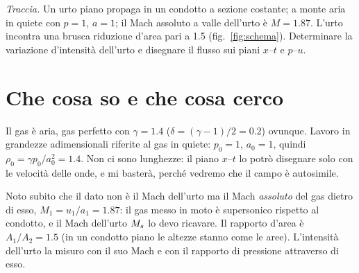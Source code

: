 

\graphicspath{{../../svolgimenti/2023-07-17_B72-E02_urto_contrazione/figure/}}

\newcommand{\uma}{u-a}
\newcommand{\upa}{u+a}
\newcommand{\Ar}{\mathcal{A}}



\maketitle

\emph{Traccia.} Un urto piano propaga in un condotto a sezione costante; a monte aria in quiete con $p=1$, $a=1$; il
Mach assoluto a valle dell'urto è $M=\num{1.87}$. L'urto incontra una brusca riduzione d'area pari a \num{1.5}
(fig.~\ref{fig:schema}). Determinare la variazione d'intensità dell'urto e disegnare il flusso sui piani $x$--$t$ e
$p$--$u$.


\section*{Che cosa so e che cosa cerco}
Il gas è aria, gas perfetto con $\gamma=\num{1.4}$ ($\delta=(\gamma-1)/2=\num{0.2}$) ovunque. Lavoro in grandezze
adimensionali riferite al gas in quiete: $p_0=1$, $a_0=1$, quindi $\rho_0=\gamma p_0/a_0^2=\num{1.4}$. Non ci sono
lunghezze: il piano $x$--$t$ lo potrò disegnare solo con le velocità delle onde, e mi basterà, perché vedremo che il
campo è autosimile.

Noto subito che il dato non è il Mach dell'urto ma il Mach \emph{assoluto} del gas dietro di esso,
$M_1=u_1/a_1=\num{1.87}$: il gas messo in moto è supersonico rispetto al condotto, e il Mach dell'urto $M_{s}$ lo devo
ricavare. Il rapporto d'area è $A_1/A_2=\num{1.5}$ (in un condotto piano le altezze stanno come le aree).
L'intensità dell'urto la misuro con il suo Mach e con il rapporto di pressione attraverso di esso.

